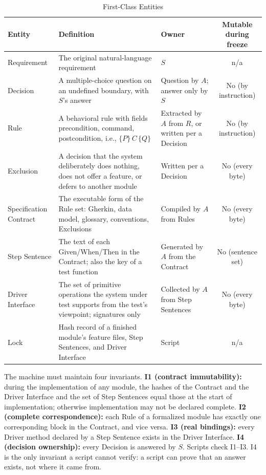 \documentclass[conference]{IEEEtran}
\begin{document}
\begin{table}[t]
\caption{First-Class Entities}\label{tab:entities}
\centering\footnotesize
\begin{tabularx}{\textwidth}{@{}lL>{\raggedright\arraybackslash}p{3.6cm}c@{}}
\toprule
Entity & Definition & Owner & Mutable during freeze \\
\midrule
Requirement & The original natural-language requirement & $S$ & n/a \\
Decision & A multiple-choice question on an undefined boundary, with $S$'s answer & Question by $A$; answer only by $S$ & No (by instruction) \\
Rule & A behavioral rule with fields precondition, command, postcondition, i.e., $\{P\}\,C\,\{Q\}$ & Extracted by $A$ from $R$, or written per a Decision & No (by instruction) \\
Exclusion & A decision that the system deliberately does nothing, does not offer a feature, or defers to another module & Written per a Decision & No (every byte) \\
Specification Contract & The executable form of the Rule set: Gherkin, data model, glossary, conventions, Exclusions & Compiled by $A$ from Rules & No (every byte) \\
Step Sentence & The text of each Given/When/Then in the Contract; also the key of a test function & Generated by $A$ from the Contract & No (sentence set) \\
Driver Interface & The set of primitive operations the system under test supports from the test's viewpoint; signatures only & Collected by $A$ from Step Sentences & No (every byte) \\
Lock & Hash record of a finished module's feature files, Step Sentences, and Driver Interface & Script & n/a \\
\bottomrule
\end{tabularx}
\end{table}

The machine must maintain four invariants.
\textbf{I1 (contract immutability):} during the implementation of any module, the hashes of the Contract and the Driver Interface and the set of Step Sentences equal those at the start of implementation; otherwise implementation may not be declared complete.
\textbf{I2 (complete correspondence):} each Rule of a formalized module has exactly one corresponding block in the Contract, and vice versa.
\textbf{I3 (real bindings):} every Driver method declared by a Step Sentence exists in the Driver Interface.
\textbf{I4 (decision ownership):} every Decision is answered by $S$.
Scripts check I1--I3. I4 is the only invariant a script cannot verify: a script can prove that an answer exists, not where it came from.
\end{document}

